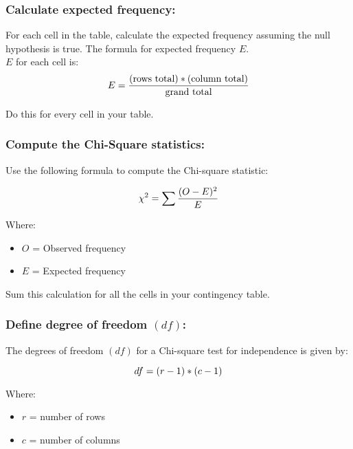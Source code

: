 \documentclass[12pt]{article}
\begin{document}
\subsubsection{Calculate expected frequency:}
For each cell in the table, calculate the expected frequency assuming the null hypothesis is true. The formula for expected frequency $E$.\\
$E$ for each cell is:\\[4pt]

\begin{equation}
E = \dfrac{(\text {rows total})*(\text {column total})}{\text {grand total}}\\[4pt]
\end{equation}

Do this for every cell in your table.

\subsubsection{Compute the Chi-Square statistics:}
Use the following formula to compute the Chi-square statistic:

\begin{equation}
 \chi^2 = \sum \dfrac{(O - E)^2}{E} \\[4pt]
\end{equation}

Where:
\begin{itemize}
\item $O$ = Observed frequency
\item $E$ = Expected frequency
\end{itemize}
Sum this calculation for all the cells in your contingency table.

\subsubsection{Define degree of freedom $(df)$:}
The degrees of freedom $(df)$ for a Chi-square test for independence is given by:

\begin{equation}
 df = (r-1)*(c-1)\\[4pt]
\end{equation}

Where:
\begin{itemize}
\item $r$ = number of rows
\item $c$ = number of columns
\end{itemize}
\end{document}
